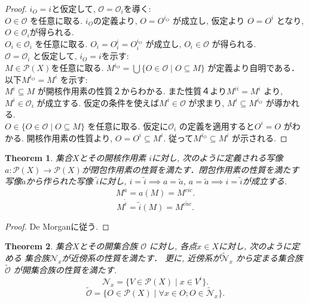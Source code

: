 \documentclass[lualatex]{ltjsbook}
\newtheorem{theorem}{Theorem}[chapter]
\theoremstyle{remark}
\theoremstyle{plain}
\begin{document}
\begin{proof}
	$i_O = i $と仮定して,   $\mathcal{O} = \mathcal{O}_i$を導く:\\
	$O \in \mathcal{O}$ を任意に取る. $i_O$の定義より,   $O = O^{i_O}$ が成立し,  
	仮定より $O = O ^{i}$ となり,  $O \in \mathcal{O}_i$が得られる.\\
	$O_i \in \mathcal{O}_i$ を任意に取る. $O_i = O_i^{i} = O_i^{i_O}$ が成立し,  $O_i \in \mathcal{O}$ が得られる.\\
	$\mathcal{O} = \mathcal{O}_i$ と仮定して,  $i_O =i$を示す:\\
	 $M \in \mathcal{P}(X)$を任意に取る. 
	 $M ^{i_O} = \bigcup \{O \in \mathcal{O} \mid O\subseteq M\} $ が定義より自明である．\\
	 以下$M^{i_O} = M^{i}$ を示す:\\
	 $M^{i} \subseteq M$ が開核作用素の性質２からわかる.
	 また性質４より$M^{ii}=M^{i}$ より,  $M^{i} \in \mathcal{O}_i$ が成立する. 
	 仮定の条件を使えば$M^{i} \in \mathcal{O}$ が求まり,  $M^{i} \subseteq M^{i_O}$ が導かれる.\\
	 $O \in \{O \in \mathcal{O} \mid O\subseteq M\} $ を任意に取る. 
	 仮定に$\mathcal{O}_i$ の定義を適用すると$O^{i}= O$ がわかる.
	 開核作用素の性質より,  $O = O^{i} \subseteq M^{i}$. 従って$M^{i_O} \subseteq  M^{i}$ が示される.
\end{proof}

\begin{theorem}
	集合$X$とその開核作用素 $i$に対し,   次のように定義される写像$a : \mathcal{P}(X) \to \mathcal{P}(X)$が閉包作用素の性質を満たす．閉包作用素の性質を満たす写像$\tilde{a}$から作られた写像 $\tilde{i}$に対し,    $ i = \tilde{i} \implies a = \tilde{a}$,  $a =\tilde{a} \implies i = \tilde{i}$が成立する.
	\[
		M^{a}= a(M) = M^{cic}
	.\] 
	\[
		M^{\tilde{i}}= \tilde{i}(M) = M^{c\tilde{a}c}
	.\] 
\end{theorem}

\begin{proof}
	De Morganに従う.
\end{proof}

\begin{theorem}
	集合$X$とその開集合族 $\mathcal{O}$ に対し,  各点$x \in X$に対し,  次のように定める 集合族$\mathcal{N}_x$が近傍系の性質を満たす． 更に,  近傍系が$\mathcal{\tilde{N}}_x$ から定まる集合族$\tilde{\mathcal{O}}$ が開集合族の性質を満たす.
	\[
	 \mathcal{N}_x =\{ V \in \mathcal{P}(X)  \mid  x \in V^{i}\} 
	.\] 
	\[
		\tilde{\mathcal{O}}= \{ O \in \mathcal{P}(X)  \mid \forall x \in O; O \in \mathcal{\tilde{N}}_x\} 
	.\] 
\end{theorem}
\end{document}
